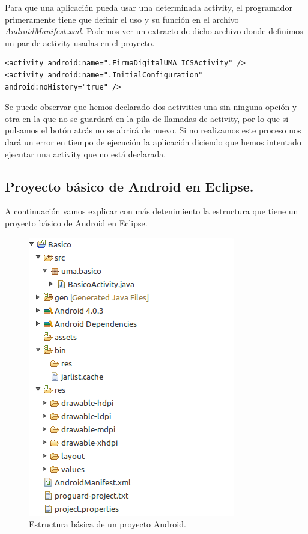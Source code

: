 Para que una aplicación pueda usar una determinada activity, el programador primeramente tiene que definir el uso y su función en el archivo \textit{AndroidManifest.xml}. Podemos ver un extracto de dicho archivo donde definimos un par de activity usadas en el proyecto.

\begin{lstlisting}[style=XML]
<activity android:name=".FirmaDigitalUMA_ICSActivity" />
<activity android:name=".InitialConfiguration" android:noHistory="true" />
\end{lstlisting}

Se puede observar que hemos declarado dos activities una sin ninguna opción y otra en la que no se guardará en la pila de llamadas de activity, por lo que si pulsamos el botón atrás no se abrirá de nuevo. Si no realizamos este proceso nos dará un error en tiempo de ejecución la aplicación diciendo que hemos intentado ejecutar una activity que no está declarada.

\subsection{Proyecto básico de Android en Eclipse.}\label{cap:proyectoBasico}

A continuación vamos explicar con más detenimiento la estructura que tiene un proyecto básico de Android en Eclipse.

\begin{figure}
  \centering
    \includegraphics[scale=1]{./Android/imagenes/estructuraBasicaAndroid.png}
  \caption{Estructura básica de un proyecto Android.}
  \label{fig:estructuraBasicaAndroid}
\end{figure}

